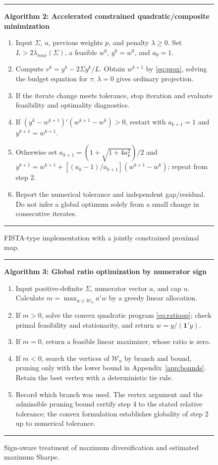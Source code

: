 \documentclass[letterpaper,journal]{IEEEtran}
\begin{document}
\begin{figure}[t]\centering
\begin{minipage}{0.96\textwidth}\hrule\smallskip
\textbf{Algorithm 2: Accelerated constrained quadratic/composite minimization}\smallskip
\begin{enumerate}\setlength{\itemsep}{1pt}
\item Input $\Sigma$, $u$, previous weights $p$, and penalty $\lambda\geq0$. Set $L>2\lambda_{max}(\Sigma)$, a feasible $w^0$, $y^0=w^0$, and $a_0=1$.
\item Compute $v^k=y^k-2\Sigma y^k/L$. Obtain $w^{k+1}$ by \eqref{eq:prox}, solving the budget equation for $\tau$; $\lambda=0$ gives ordinary projection.
\item If the iterate change meets tolerance, stop iteration and evaluate feasibility and optimality diagnostics.
\item If $(y^k-w^{k+1})'(w^{k+1}-w^k)>0$, restart with $a_{k+1}=1$ and $y^{k+1}=w^{k+1}$.
\item Otherwise set $a_{k+1}=(1+\sqrt{1+4a_k^2})/2$ and $y^{k+1}=w^{k+1}+[(a_k-1)/a_{k+1}](w^{k+1}-w^k)$; repeat from step 2.
\item Report the numerical tolerance and independent gap/residual. Do not infer a global optimum solely from a small change in consecutive iterates.
\end{enumerate}\hrule
\end{minipage}
\caption{FISTA-type implementation with a jointly constrained proximal map.}\label{alg:prox}
\end{figure}

\begin{figure}[t]\centering
\begin{minipage}{0.96\textwidth}\hrule\smallskip
\textbf{Algorithm 3: Global ratio optimization by numerator sign}\smallskip
\begin{enumerate}\setlength{\itemsep}{1pt}
\item Input positive-definite $\Sigma$, numerator vector $a$, and cap $u$. Calculate $m=\max_{w\in\mathcal W_u}a'w$ by a greedy linear allocation.
\item If $m>0$, solve the convex quadratic program \eqref{eq:ratioqp}; check primal feasibility and stationarity, and return $w=y/(\mathbf1'y)$.
\item If $m=0$, return a feasible linear maximizer, whose ratio is zero.
\item If $m<0$, search the vertices of $\mathcal W_u$ by branch and bound, pruning only with the lower bound in Appendix~\ref{app:bounds}. Retain the best vertex with a deterministic tie rule.
\item Record which branch was used. The vertex argument and the admissible pruning bound certify step 4 to the stated relative tolerance; the convex formulation establishes globality of step 2 up to numerical tolerance.
\end{enumerate}\hrule
\end{minipage}
\caption{Sign-aware treatment of maximum diversification and estimated maximum Sharpe.}\label{alg:ratio}
\end{figure}
\end{document}
